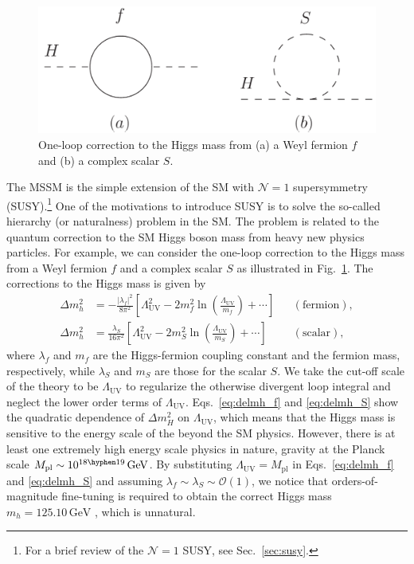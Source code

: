 \documentclass[12pt,twoside,book]{article}
\begin{document}

\begin{figure}[b]
  \centering
  \includegraphics[width=0.6\hsize]{loop_correction.pdf}
  \caption{One-loop correction to the Higgs mass from (a) a Weyl fermion $f$ and (b) a complex scalar $S$.}
  \label{fig:loop_correction}
\end{figure}

The MSSM is the simple extension of the SM with $\mathcal{N} = 1$ supersymmetry (SUSY).\footnote
{
  For a brief review of the $\mathcal{N} = 1$ SUSY, see Sec.~\ref{sec:susy}.
}
One of the motivations to introduce SUSY is to solve the so-called hierarchy (or naturalness) problem \cite{Weinberg:1975gm,Gildener:1976ai,Susskind:1978ms} in the SM.
The problem is related to the quantum correction to the SM Higgs boson mass from heavy new physics particles.
For example, we can consider the one-loop correction to the Higgs mass from a Weyl fermion $f$ and a complex scalar $S$ as illustrated in Fig.~\ref{fig:loop_correction}.
The corrections to the Higgs mass is given by
\begin{align}
  \Delta m_h^2 &= -\frac{|\lambda_f|^2}{8 \pi^2} \left[
  \Lambda_{\mathrm{UV}}^2 - 2 m_f^2 \ln \left( \frac{\Lambda_{\mathrm{UV}}}{m_f} \right)
  + \cdots \right] & &\mathrm{(fermion)}, \label{eq:delmh_f}\\
  \Delta m_h^2 &= \frac{\lambda_S}{16 \pi^2} \left[
  \Lambda_{\mathrm{UV}}^2 - 2 m_S^2 \ln \left( \frac{\Lambda_{\mathrm{UV}}}{m_S} \right)
  + \cdots \right] & &\mathrm{(scalar)}, \label{eq:delmh_S}
\end{align}
where $\lambda_f$ and $m_f$ are the Higgs-fermion coupling constant and the fermion mass, respectively, while $\lambda_S$ and $m_S$ are those for the scalar $S$.
We take the cut-off scale of the theory to be $\Lambda_{\mathrm{UV}}$ to regularize the otherwise divergent loop integral and neglect the lower order terms of $\Lambda_{\mathrm{UV}}$.
Eqs.~\eqref{eq:delmh_f} and \eqref{eq:delmh_S} show the quadratic dependence of $\Delta m_H^2$ on $\Lambda_{\mathrm{UV}}$, which means that the Higgs mass is sensitive to the energy scale of the beyond the SM physics.
However, there is at least one extremely high energy scale physics in nature, gravity at the Planck scale $M_{\mathrm{pl}} \sim 10^{18 \hyphen 19}\,\mathrm{GeV}$.
By substituting $\Lambda_{\mathrm{UV}} = M_{\mathrm{pl}}$ in Eqs.~\eqref{eq:delmh_f} and \eqref{eq:delmh_S} and assuming $\lambda_f \sim \lambda_S \sim \mathcal{O} (1)$, we notice that orders-of-magnitude fine-tuning is required to obtain the correct Higgs mass $m_h = 125.10\,\mathrm{GeV}$ \cite{Tanabashi:2018oca}, which is unnatural.
\end{document}

